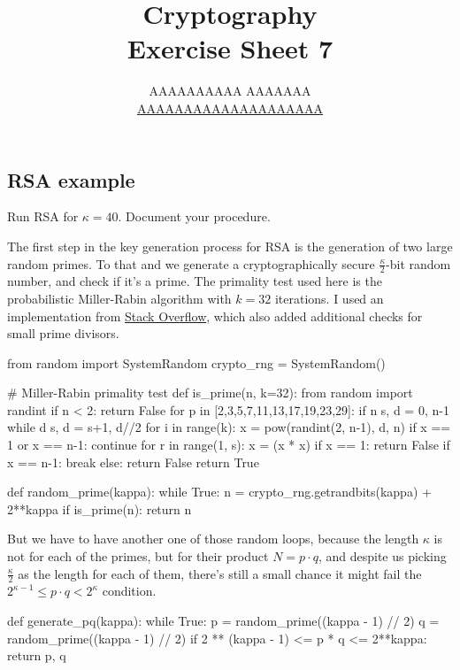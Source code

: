 \documentclass{article}
\title{Cryptography \\ Exercise Sheet 7}
\author{
  AAAAAAAAAA AAAAAAA \\
  \href{mailto:AAAAAAAAAAAAAAAAAAAA}{AAAAAAAAAAAAAAAAAAAA}
}
\begin{document}
  \maketitle

  \setcounter{section}{7}
  \subsection{RSA example}
  \begin{centerframebox}
    Run RSA for $\kappa = 40$. Document your procedure.
  \end{centerframebox}
  The first step in the key generation process for RSA is the generation of two large random primes.
  To that and we generate a cryptographically secure $\frac{\kappa}{2}$-bit random number,
  and check if it's a prime.
  The primality test used here is the probabilistic Miller-Rabin algorithm with $k=32$ iterations.
  I used an implementation from \href{https://stackoverflow.com/a/36525088}{Stack Overflow},
  which also added additional checks for small prime divisors.
  \begin{mylisting}
    from random import SystemRandom
    crypto_rng = SystemRandom()

    # Miller-Rabin primality test
    def is_prime(n, k=32):
        from random import randint
        if n < 2: return False
        for p in [2,3,5,7,11,13,17,19,23,29]:
            if n %
        s, d = 0, n-1
        while d %
            s, d = s+1, d//2
        for i in range(k):
            x = pow(randint(2, n-1), d, n)
            if x == 1 or x == n-1: continue
            for r in range(1, s):
                x = (x * x) %
                if x == 1: return False
                if x == n-1: break
            else: return False
        return True

    def random_prime(kappa):
        while True:
            n = crypto_rng.getrandbits(kappa) + 2**kappa
            if is_prime(n):
                return n
  \end{mylisting}

  But we have to have another one of those random loops, because the length $\kappa$ is not for each of the primes,
  but for their product $N = p\cdot q$, and despite us picking $\frac{\kappa}{2}$ as the length for each of them,
  there's still a small chance it might fail the $2^{\kappa-1} \leq p\cdot q < 2^\kappa$ condition.
  \begin{mylisting}
    def generate_pq(kappa):
        while True:
            p = random_prime((kappa - 1) // 2)
            q = random_prime((kappa - 1) // 2)
            if 2 ** (kappa - 1) <= p * q <= 2**kappa:
                return p, q
  \end{mylisting}
\end{document}
